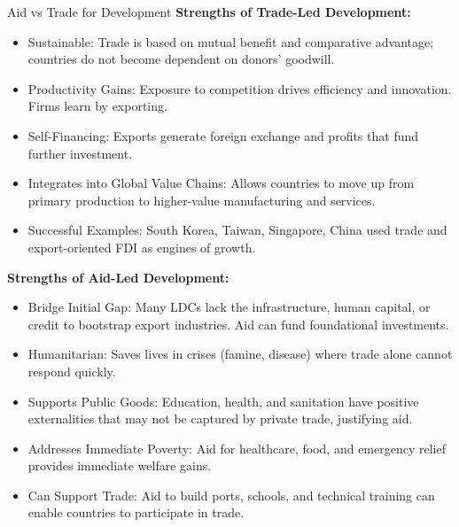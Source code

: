 \documentclass[11pt, a4paper, twoside]{book}
\begin{document}
\begin{evaluation}{Aid vs Trade for Development}
\textbf{Strengths of Trade-Led Development:}
\begin{itemize}
  \item Sustainable: Trade is based on mutual benefit and comparative advantage; countries do not become dependent on donors' goodwill.
  \item Productivity Gains: Exposure to competition drives efficiency and innovation. Firms learn by exporting.
  \item Self-Financing: Exports generate foreign exchange and profits that fund further investment.
  \item Integrates into Global Value Chains: Allows countries to move up from primary production to higher-value manufacturing and services.
  \item Successful Examples: South Korea, Taiwan, Singapore, China used trade and export-oriented FDI as engines of growth.
\end{itemize}

\textbf{Strengths of Aid-Led Development:}
\begin{itemize}
  \item Bridge Initial Gap: Many LDCs lack the infrastructure, human capital, or credit to bootstrap export industries. Aid can fund foundational investments.
  \item Humanitarian: Saves lives in crises (famine, disease) where trade alone cannot respond quickly.
  \item Supports Public Goods: Education, health, and sanitation have positive externalities that may not be captured by private trade, justifying aid.
  \item Addresses Immediate Poverty: Aid for healthcare, food, and emergency relief provides immediate welfare gains.
  \item Can Support Trade: Aid to build ports, schools, and technical training can enable countries to participate in trade.
\end{itemize}


\end{evaluation}
\end{document}
